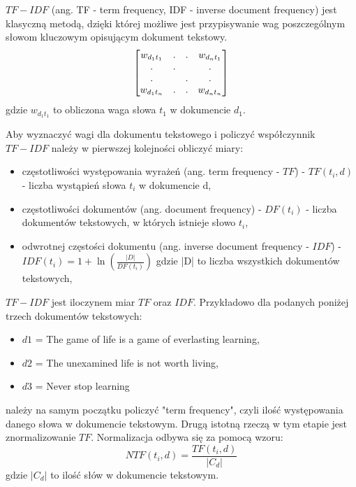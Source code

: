         $TF-IDF$ (ang. TF - term frequency, IDF - inverse document frequency) jest klasyczną metodą, dzięki której możliwe jest przypisywanie wag poszczególnym słowom kluczowym opisującym dokument tekstowy.
        \begin{equation}
            \begin{bmatrix}
            $$w_{d_1t_1}$$ & . & . & $$w_{d_nt_1}$$\\ 
            . & . &  & .\\ 
            . &  & . & .\\ 
            $$w_{d_1t_n}$$ & . & . & $$w_{d_nt_n}$$
            \end{bmatrix}
        \end{equation}
        gdzie $w_{d_1t_1}$ to obliczona waga słowa $t_1$ w dokumencie $d_1$.
        
        
        Aby wyznaczyć wagi dla dokumentu tekstowego i policzyć współczynnik $TF-IDF$ należy w pierwszej kolejności obliczyć miary:
        \begin{itemize}
            \item częstotliwości występowania wyrażeń (ang. term frequency - $TF$) - $TF(t_i, d)$ - liczba wystąpień słowa $t_i$ w dokumencie d,
            \item częstotliwości dokumentów (ang. document frequency) - $DF(t_i)$ - liczba dokumentów tekstowych, w których istnieje słowo $t_i$,
            \item odwrotnej częstości dokumentu (ang. inverse document frequency - $IDF$) - $IDF(t_i) = 1+\ln{\left(\frac{|D|}{DF(t_i)}\right)}$ \cite{tfidf} gdzie |D| to liczba wszystkich dokumentów tekstowych,
        \end{itemize}
        $TF-IDF$ jest iloczynem miar $TF$ oraz $IDF$. 
        Przykładowo dla podanych poniżej trzech dokumentów tekstowych:
        \begin{itemize}
            \item $d1$ = The game of life is a game of everlasting learning,
            \item $d2$ = The unexamined life is not worth living,
            \item $d3$ = Never stop learning
        \end{itemize} należy na samym początku policzyć "term frequency", czyli ilość występowania danego słowa w dokumencie tekstowym. Drugą istotną rzeczą w tym etapie jest znormalizowanie $TF$. Normalizacja odbywa się za pomocą wzoru:
        \begin{equation}
            NTF(t_i, d) = \frac{TF(t_i, d)}{|C_d|}
        \end{equation}
        gdzie $|C_d|$ to ilość słów w dokumencie tekstowym.
        
